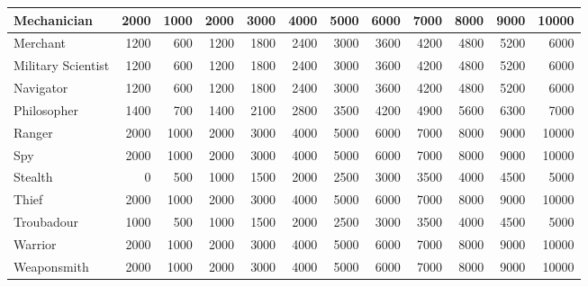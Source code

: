 {\begin{tabularx}{\linewidth}{Xrrrrrrrrrrr}
Mechanician				& 2000	& 1000	& 2000	& 3000	& 4000	& 5000	& 6000	& 7000	& 8000	& 9000	& 10000	\\ \hline
Merchant\footnotemark[4]		& 1200	& 600	& 1200	& 1800	& 2400	& 3000	& 3600	& 4200	& 4800	& 5200	& 6000	\\ \hline
Military Scientist			& 1200	& 600	& 1200	& 1800	& 2400	& 3000	& 3600	& 4200	& 4800	& 5200	& 6000	\\ \hline
Navigator				& 1200	& 600	& 1200	& 1800	& 2400	& 3000	& 3600	& 4200	& 4800	& 5200	& 6000	\\ \hline
Philosopher				& 1400	& 700	& 1400	& 2100	& 2800	& 3500	& 4200	& 4900	& 5600	& 6300	& 7000	\\ \hline
Ranger					& 2000	& 1000	& 2000	& 3000	& 4000	& 5000	& 6000	& 7000	& 8000	& 9000	& 10000	\\ \hline
Spy\footnotemark[5]			& 2000	& 1000	& 2000	& 3000	& 4000	& 5000	& 6000	& 7000	& 8000	& 9000	& 10000	\\ \hline
Stealth					& 0	& 500	& 1000	& 1500	& 2000	& 2500	& 3000	& 3500	& 4000	& 4500	& 5000	\\ \hline
Thief\footnotemark[5]			& 2000	& 1000	& 2000	& 3000	& 4000	& 5000	& 6000	& 7000	& 8000	& 9000	& 10000	\\ \hline
Troubadour\footnotemark[6]		& 1000	& 500	& 1000	& 1500	& 2000	& 2500	& 3000	& 3500	& 4000	& 4500	& 5000	\\ \hline
Warrior					& 2000	& 1000	& 2000	& 3000	& 4000	& 5000	& 6000	& 7000	& 8000	& 9000	& 10000	\\ \hline
Weaponsmith				& 2000	& 1000	& 2000	& 3000	& 4000	& 5000	& 6000	& 7000	& 8000	& 9000	& 10000	\\ \hline
\end{tabularx}}

